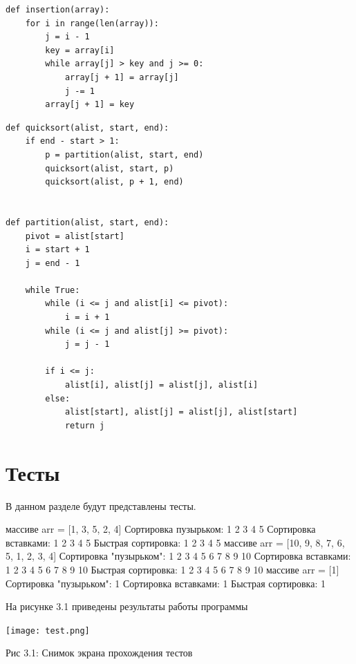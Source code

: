 \documentclass[12pt]{report}
\begin{document}
\begin{lstlisting}[label=some-code,caption=Подпрограмма алгоритма сортировки вставками]
def insertion(array):
    for i in range(len(array)):
        j = i - 1
        key = array[i]
        while array[j] > key and j >= 0:
            array[j + 1] = array[j]
            j -= 1
        array[j + 1] = key
\end{lstlisting}

\begin{lstlisting}[label=some-code,caption=Подпрограмма алгоритма быстрой сортировки]
def quicksort(alist, start, end):
    if end - start > 1:
        p = partition(alist, start, end)
        quicksort(alist, start, p)
        quicksort(alist, p + 1, end)


def partition(alist, start, end):
    pivot = alist[start]
    i = start + 1
    j = end - 1

    while True:
        while (i <= j and alist[i] <= pivot):
            i = i + 1
        while (i <= j and alist[j] >= pivot):
            j = j - 1

        if i <= j:
            alist[i], alist[j] = alist[j], alist[i]
        else:
            alist[start], alist[j] = alist[j], alist[start]
            return j

\end{lstlisting}

\section{Тесты}

В данном разделе будут представлены тесты.

\begin{enumerate}
	 массиве arr = [1, 3, 5, 2, 4] 
	Сортировка пузырьком: 1 2 3 4 5
	Сортировка вставками: 1 2 3 4 5
	Быстрая сортировка: 1 2 3 4 5
	 массиве arr = [10, 9, 8, 7, 6, 5, 1, 2, 3, 4] 
	Сортировка "пузырьком": 1 2 3 4 5 6 7 8 9 10
	Сортировка вставками:  1 2 3 4 5 6 7 8 9 10
	Быстрая сортировка:  1 2 3 4 5 6 7 8 9 10
	 массиве arr = [1] 
	Сортировка "пузырьком": 1
	Сортировка вставками: 1
	Быстрая сортировка: 1 

\end{enumerate}
На рисунке 3.1 приведены результаты работы программы
\begin{center}
		\texttt{[image: test.png]}
		
			Рис 3.1: Снимок экрана прохождения тестов
\end{center}
\end{document}
